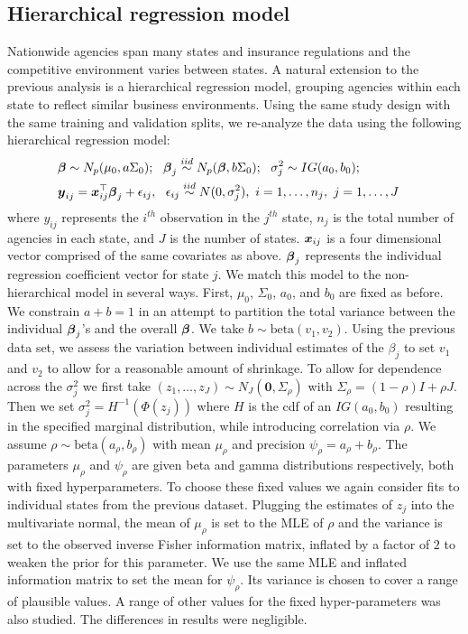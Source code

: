 \documentclass[12pt]{article}
\def\bbeta{\mbox{\boldmath $\beta$}}
\newcommand{\bx}{\mbox{\boldmath $x$}}
\newcommand{\by}{\mbox{\boldmath $y$}}
\newcommand{\iid}{\stackrel{iid}{\sim}}
\begin{document}
\subsection{Hierarchical regression model}
Nationwide agencies span many states and insurance regulations and the competitive environment varies between states. A natural extension to the previous analysis is a hierarchical regression model, grouping agencies within each state to reflect similar business environments. Using the same study design with the same training and validation splits, we re-analyze the data using the following hierarchical regression model:
\begin{align}
\label{eq:hierModel}
&\bbeta\sim N_p(\mu_0, a\Sigma_0);\ \ 
\bbeta_j\iid N_p(\bbeta, b\Sigma_0);\nonumber \ \  
\sigma_j^2\sim IG(a_0,b_0);  & \\ 
& \by_{ij}=\bx_{ij}^\top\bbeta_j+\epsilon_{ij},\ \ \epsilon_{ij}\iid N(0, \sigma_j^2),\ i=1,\dots, n_j,\ j=1,\dots, J & \nonumber
\end{align}
where $y_{ij}$  represents the $i^{th}$ observation in the $j^{th}$
state, $n_j$ is the total number of agencies in each state, and $J$ is
the number of states. $\bx_{ij}$ is a four dimensional vector
comprised of the same covariates as above. $\bbeta_j$ represents the
individual regression coefficient vector for state $j$.  We match this
model to the non-hierarchical model in several ways. First, $\mu_0$,
$\Sigma_0$, $a_0$, and $b_0$ are fixed as before. We constrain $a+b=1$
in an attempt to partition the total variance between the individual
$\bbeta_j$'s and the overall $\bbeta$. We take $b\sim
\text{beta}(v_1,v_2)$. Using the previous data set, we assess the
variation between individual estimates of the $\beta_j$ to set $v_1$
and $v_2$ to allow for a reasonable amount of shrinkage. To allow for
dependence across the $\sigma_j^2$ we first take
$(z_1,\dots,z_J)\sim N_J(\mathbf{0}, \Sigma_\rho)$ with
$\Sigma_\rho=(1-\rho)I+\rho J$. Then we set
$\sigma^2_j=H^{-1}(\Phi(z_j))$ where $H$ is the cdf of an
$IG(a_0,b_0)$ resulting in the specified marginal distribution, while
introducing correlation via $\rho$. We assume $\rho\sim
\text{beta}(a_\rho,b_\rho)$ with mean $\mu_\rho$ and precision
$\psi_\rho=a_\rho+b_\rho$. The parameters $\mu_\rho$ and
$\psi_{\rho}$  are given beta and gamma distributions respectively, both with fixed hyperparameters. To choose these fixed values we again consider fits to individual states from the previous dataset. Plugging the estimates of $z_j$ into the multivariate normal, the mean of $\mu_\rho$ is set to the MLE of $\rho$ and the variance is set to the observed inverse Fisher information matrix, inflated by a factor of $2$ to weaken the prior for this parameter.  We use the same MLE and inflated information matrix to set the mean for $\psi_{\rho}$. Its variance is chosen to cover a range of plausible values. A range of other values for the fixed hyper-parameters was also studied.  The differences in results were negligible. 
\end{document}
